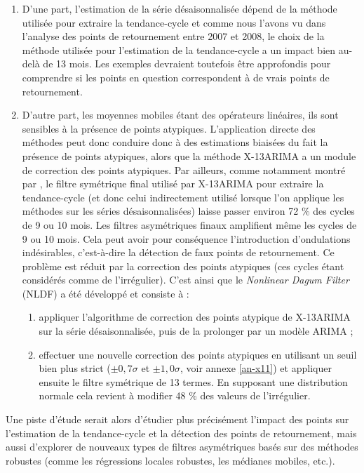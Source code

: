 \documentclass[
  11pt,
  french,
  a4paper]{article}
\newcommand\1{\mathds{1}}
\begin{document}
\begin{enumerate}
\def\labelenumi{\arabic{enumi}.}
\item
  D'une part, l'estimation de la série désaisonnalisée dépend de la méthode utilisée pour extraire la tendance-cycle et comme nous l'avons vu dans l'analyse des points de retournement entre 2007 et 2008, le choix de la méthode utilisée pour l'estimation de la tendance-cycle a un impact bien au-delà de 13 mois.
  Les exemples devraient toutefois être approfondis pour comprendre si les points en question correspondent à de vrais points de retournement.
\item
  D'autre part, les moyennes mobiles étant des opérateurs linéaires, ils sont sensibles à la présence de points atypiques.
  L'application directe des méthodes peut donc conduire donc à des estimations biaisées du fait la présence de points atypiques, alors que la méthode X-13ARIMA a un module de correction des points atypiques.
  Par ailleurs, comme notamment montré par \textcite{dagum1996new}, le filtre symétrique final utilisé par X-13ARIMA pour extraire la tendance-cycle (et donc celui indirectement utilisé lorsque l'on applique les méthodes sur les séries désaisonnalisées) laisse passer environ 72 \% des cycles de 9 ou 10 mois.
  Les filtres asymétriques finaux amplifient même les cycles de 9 ou 10 mois.
  Cela peut avoir pour conséquence l'introduction d'ondulations indésirables, c'est-à-dire la détection de faux points de retournement.
  Ce problème est réduit par la correction des points atypiques (ces cycles étant considérés comme de l'irrégulier).
  C'est ainsi que le \emph{Nonlinear Dagum Filter} (NLDF) a été développé et consiste à :

  \begin{enumerate}
  \def\labelenumii{\alph{enumii}.}
  \item
    appliquer l'algorithme de correction des points atypique de X-13ARIMA sur la série désaisonnalisée, puis de la prolonger par un modèle ARIMA ;
  \item
    effectuer une nouvelle correction des points atypiques en utilisant un seuil bien plus strict (\(\pm0,7\sigma\) et \(\pm 1,0 \sigma\), voir annexe \ref{an-x11}) et appliquer ensuite le filtre symétrique de 13 termes.
    En supposant une distribution normale cela revient à modifier 48 \% des valeurs de l'irrégulier.
  \end{enumerate}
\end{enumerate}

Une piste d'étude serait alors d'étudier plus précisément l'impact des points sur l'estimation de la tendance-cycle et la détection des points de retournement, mais aussi d'explorer de nouveaux types de filtres asymétriques basés sur des méthodes robustes (comme les régressions locales robustes, les médianes mobiles, etc.).
\end{document}
